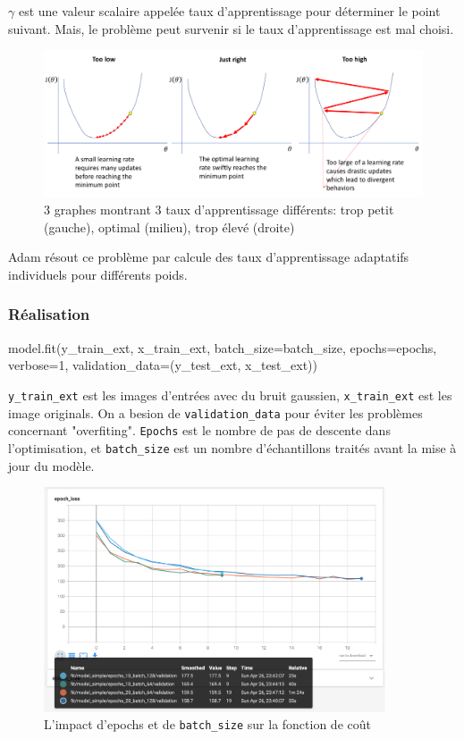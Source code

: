 \documentclass[12pt,a4paper]{article}
\begin{document}
$\gamma$ est une valeur scalaire appelée taux d'apprentissage pour déterminer le point suivant.
Mais, le problème peut survenir si le taux d'apprentissage est mal choisi.
\begin{figure}[h!]
  \centering
  \includegraphics[width=1.0\textwidth]{learning_rate.png}
  \caption[Le taux d'apprentissage]{3 graphes montrant 3 taux d'apprentissage différents:
  trop petit (gauche), optimal (milieu), trop élevé (droite)}
  \label{fig:7}
\end{figure}

Adam résout ce problème par calcule des taux d'apprentissage adaptatifs individuels pour
différents poids.

\subsubsection{Réalisation}
\begin{python}
model.fit(y_train_ext, x_train_ext,
          batch_size=batch_size,
          epochs=epochs,
          verbose=1,
          validation_data=(y_test_ext, x_test_ext))
\end{python}

\lstinline{y_train_ext} est les images d'entrées avec du bruit gaussien,
\lstinline{x_train_ext} est les image originals. On a besion de \lstinline{validation_data} pour
éviter les problèmes concernant "overfiting". \lstinline{Epochs} est le nombre de pas de descente dans l'optimisation,
et \lstinline{batch_size} est un nombre d'échantillons traités avant la mise à jour du modèle.
\begin{figure}[h!]
  \centering
  \includegraphics[width=0.9\textwidth]{epochs_batch.png}
  \caption[Epochs et \lstinline{batch_size}]{L'impact d'epochs et de \lstinline{batch_size} sur la fonction de coût}
  \label{fig:8}
\end{figure}
\end{document}

